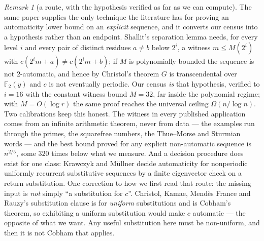 \documentclass[11pt]{article}
\theoremstyle{definition}
\theoremstyle{remark}
\newtheorem{remark}[theorem]{Remark}
\newcommand{\F}{\mathbb{F}_2}
\begin{document}
\begin{remark}[a route, with the hypothesis verified as far as we can compute]\label{du:shallitroute}
The same paper supplies the only technique the literature has for proving an automaticity lower bound on
an \emph{explicit} sequence, and it converts our census into a hypothesis rather than an endpoint.
Shallit's separation lemma \cite[Lemmas 3, 12]{Shallit4} needs, for every level $i$ and every pair of
distinct residues $a\neq b$ below $2^i$, a witness $m\le M(2^i)$ with
$c(2^im+a)\neq c(2^im+b)$; if $M$ is polynomially bounded the sequence is not $2$-automatic, and hence
by Christol's theorem $G$ is transcendental over $\F(y)$ and $c$ is not eventually periodic. Our census
\emph{is} that hypothesis, verified to $i=16$ with the constant witness bound $M=32$, far inside the
polynomial regime; with $M=O(\log r)$ the same proof reaches the universal ceiling $\Omega(n/\log n)$.
Two calibrations keep this honest. The witness in every published application comes from an infinite
arithmetic theorem, never from data --- the examples run through the primes, the squarefree numbers, the
Thue--Morse and Sturmian words --- and the best bound proved for any explicit non-automatic sequence is
$n^{2/5}$, some $320$ times below what we measure. And a decision procedure does exist for one class:
Krawczyk and M\"ullner \cite[Thm.~B]{KrawczykMullner} decide automaticity for nonperiodic uniformly recurrent substitutive sequences by
a finite eigenvector check on a return substitution. One correction to how we first read that route:
the missing input is \emph{not} simply ``a substitution for $c$''. Christol, Kamae, Mend\`es France and
Rauzy's substitution clause \cite{CKMFR} is for \emph{uniform} substitutions and is Cobham's theorem, so
exhibiting a uniform substitution would make $c$ automatic --- the opposite of what we want. Any useful
substitution here must be non-uniform, and then it is not Cobham that applies.
\end{remark}
\end{document}
